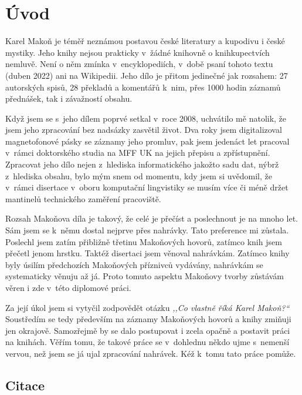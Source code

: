 \chapter{Úvod}
\label{kap:uvod}

Karel Makoň je téměř neznámou postavou české literatury a kupodivu i české
mystiky. Jeho knihy nejsou prakticky v~žádné knihovně o knihkupectvích nemluvě.
Není o něm zmínka v~encyklopediích, v~době psaní tohoto textu (duben 2022) ani
na Wikipedii. Jeho dílo je přitom jedinečné jak rozsahem: 27 autorských spisů,
28 překladů a komentářů k~nim, přes 1000 hodin záznamů přednášek, tak i
závažností obsahu.

Když jsem se s~jeho dílem poprvé setkal v~roce 2008, uchvátilo mě natolik, že
jsem jeho zpracování bez nadsázky zasvětil život. Dva roky jsem digitalizoval
magnetofonové pásky se záznamy jeho promluv, pak jsem jedenáct let pracoval
v~rámci doktorského studia na MFF UK na jejich přepisu a zpřístupnění. Zpracovat
jeho dílo nejen z~hlediska informatického jakožto sadu dat, nýbrž z~hlediska
obsahu, bylo mým snem od momentu, kdy jsem si uvědomil, že v~rámci disertace
v~oboru komputační lingvistiky se musím více či méně držet mantinelů technického
zaměření pracoviště.

Rozsah Makoňova díla je takový, že celé je přečíst a poslechnout je na mnoho
let. Sám jsem se k~němu dostal nejprve přes nahrávky. Tato preference mi
zůstala. Poslechl jsem zatím přibližně třetinu Makoňových hovorů, zatímco knih
jsem přečetl jenom hrstku. Taktéž disertaci jsem věnoval nahrávkám. Zatímco
knihy byly úsilím předchozích Makoňových příznivců vydávány, nahrávkám se
systematicky věnuju až já. Proto tomuto aspektu Makoňovy tvorby zůstávám věren i
zde v~této diplomové práci.

Za její úkol jsem si vytyčil zodpovědět otázku \textit{,,Co vlastně říká Karel
Makoň?{}``} Soustředím se tedy především na záznamy Makoňových hovorů a knihy
zmiňuji jen okrajově. Samozřejmě by se dalo postupovat i zcela opačně a postavit
práci na knihách. Věřím tomu, že takové práce se v~dohlednu někdo ujme s~nemenší
vervou, než jsem se já ujal zpracování nahrávek. Kéž k~tomu tato práce pomůže.

\section{Citace}

